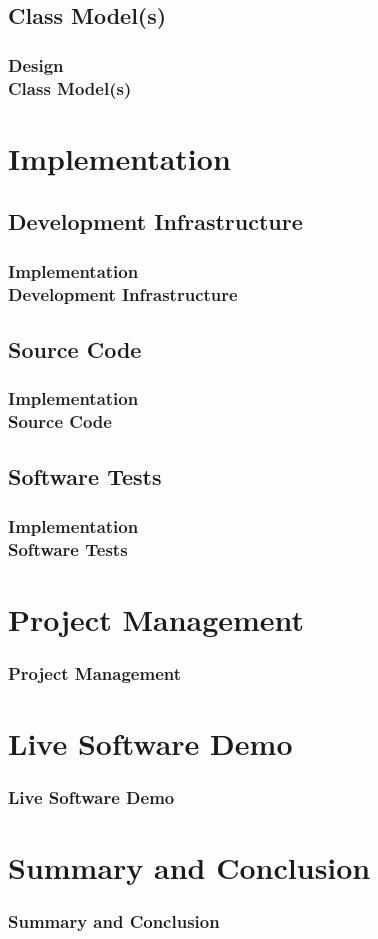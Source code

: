 \documentclass[ucs,10pt]{beamer}
\begin{document}
\subsection{Class Model(s)}

\begin{frame}
\frametitle{Design \\
	\small \color{rwth-blue} Class Model(s)}
\end{frame}

\section{Implementation}

\subsection{Development Infrastructure}

\begin{frame}
\frametitle{Implementation \\
	\small \color{rwth-blue} Development Infrastructure}
\end{frame}

\subsection{Source Code}

\begin{frame}
\frametitle{Implementation \\
	\small \color{rwth-blue} Source Code}
\end{frame}

\subsection{Software Tests}

\begin{frame}
\frametitle{Implementation \\
	\small \color{rwth-blue} Software Tests}
\end{frame}

\section{Project Management}

\begin{frame}
\frametitle{Project Management}
\end{frame}

\section{Live Software Demo}

\begin{frame}
\frametitle{Live Software Demo} 
\end{frame}

\section{Summary and Conclusion}

\begin{frame}
\frametitle{Summary and Conclusion}
\end{frame}
\end{document}
